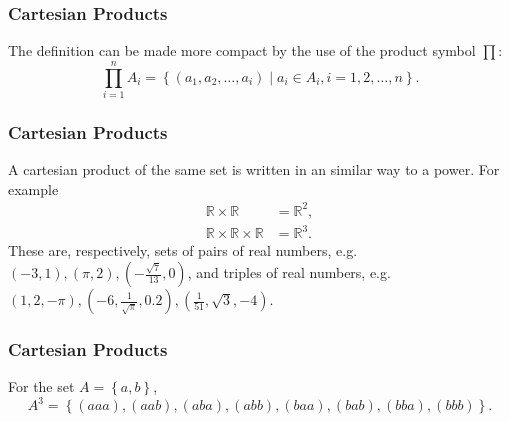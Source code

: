 \begin{frame}
  \frametitle{Cartesian Products}
  The definition can be made more compact by the use of the product symbol $\prod$:
  \begin{equation*}
    \prod\limits_{i=1}^{n} A_{i} = \left\{ \left( a_{1}, a_{2}, \dots, a_{i} \right) \mid a_{i}\in A_{i}, i=1,2,\dots,n\right\}.
  \end{equation*}

\end{frame}

\begin{frame}
  \frametitle{Cartesian Products}
  A cartesian product of the same set is written in an similar way to a power. For example
  \begin{align*}
    \mathbb{R}\times\mathbb{R} &= \mathbb{R}^{2},\\
    \mathbb{R}\times\mathbb{R}\times\mathbb{R} &= \mathbb{R}^{3}.
  \end{align*}
  These are, respectively, sets of pairs of real numbers, e.g. $\left( -3,1 \right), (\pi,2), (-\frac{\sqrt{7}}{13}, 0)$, and triples of real numbers, e.g. $\left( 1,2,-\pi \right), \left( -6,\frac{1}{\sqrt{\pi}}, 0.2 \right), \left( \frac{1}{51}, \sqrt{3}, -4 \right)$.
\end{frame}

\begin{frame}
  \frametitle{Cartesian Products}
  \begin{presentation_example}
    For the set $A=\left\{ a,b \right\}$,
    \begin{equation*}
      A^{3}=\left\{(aaa),(aab),(aba),(abb),(baa),(bab),(bba),(bbb)\right\}.
    \end{equation*}

  \end{presentation_example}
\end{frame}

